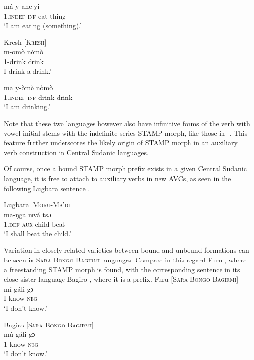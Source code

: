 \documentclass[output=paper]{langsci/langscibook}
\begin{document}
\ex \label{ex:anderson:55b}
\gll má    y-ane    yi\\
 1.\textsc{indef}  \textsc{inf}-eat    thing\\
\glt `I am eating (something).'
\z
\z

\ea\label{ex:anderson:56}
Kresh \citep[75]{TuckerBryan1966}     [\textsc{Kresh}]\\
\ea\label{ex:anderson:56a}
\gll m-omò    nòmò\\
  1-drink   drink    \\
\glt I drink a drink.'     


\ex \label{ex:anderson:56b}
\gll ma     y-òmò    nòmò\\
  \textsc{1.indef}  \textsc{inf}-drink   drink\\
\glt `I am drinking.'
\z
\z

Note that these two languages however also have infinitive forms of the verb with vowel initial stems with the indefinite series STAMP morph, like those in -. This feature further underscores the likely origin of STAMP morph in an auxiliary verb construction in Central Sudanic languages.

Of course, once a bound STAMP morph prefix exists in a given Central Sudanic language, it is free to attach to auxiliary verbs in new AVCs, as seen in the following Lugbara sentence .

\ea\label{ex:anderson:57}
Lugbara \citep[46, 47]{TuckerBryan1966}      \textsc{[Moru-Ma'di]}\\
\gll ma-ŋga  mvá  tsɔ\\
\textsc{1.def-aux}  child  beat\\
\glt `I shall beat the child.'    
\z

Variation in closely related varieties between bound and unbound formations can be seen in \textsc{Sara-Bongo-Bagirmi} languages. Compare in this regard Furu , where a freestanding STAMP morph is found, with the corresponding sentence in its close sister language Bagiro , where it is a prefix.
\ea\label{ex:anderson:58}
Furu \citep[91]{Boyeldieu1990}           [\textsc{Sara-Bongo-Bagirmi}]\\
\gll mí  gáli  gɔ          \\
I   know  \textsc{neg}      \\
\glt `I don't know.'
\z

\ea\label{ex:anderson:59}
Bagiro  \citep[91]{Boyeldieu1990}           [\textsc{Sara-Bongo-Bagirmi}]\\
\gll mú-gá{\downstep}li  gɔ\\
1-know  \textsc{neg}\\
\glt `I don't know.'  
\z
\end{document}
